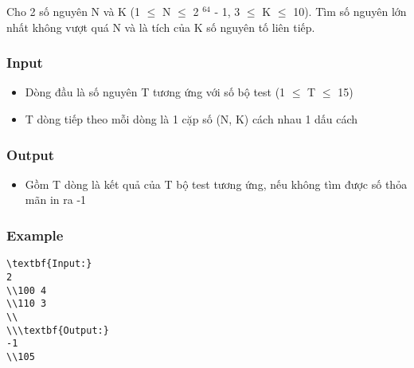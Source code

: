 



   Cho 2 số nguyên N và K (1  $\le$  N  $\le$  2   $^    64   $   - 1, 3  $\le$  K  $\le$  10). Tìm số nguyên lớn nhất không vượt quá N và là tích của K số nguyên tố liên tiếp.  

\subsubsection{   Input  }
\begin{itemize}
	\item     Dòng đầu là số nguyên T tương ứng với số bộ test (1  $\le$  T  $\le$  15)   
	\item     T dòng tiếp theo mỗi dòng là 1 cặp số (N, K) cách nhau 1 dấu cách   
\end{itemize}

\subsubsection{   Output  }
\begin{itemize}
	\item     Gồm T dòng là kết quả của T bộ test tương ứng, nếu không tìm được số thỏa mãn in ra -1   
\end{itemize}

\subsubsection{   Example  }
\begin{verbatim}
\textbf{Input:}
2
\\100 4
\\110 3
\\
\\\textbf{Output:}
-1
\\105 \end{verbatim}
